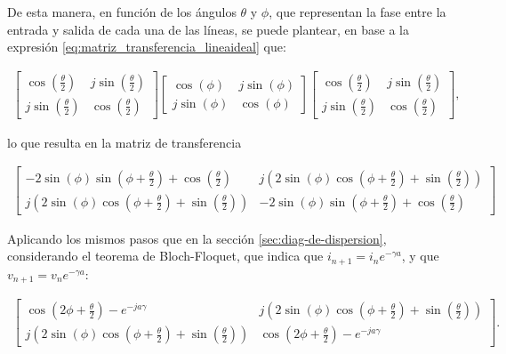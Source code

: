 De esta manera, en función de los ángulos $\theta$ y $\phi$, que representan la fase entre la entrada y salida de cada una de las líneas, se puede plantear, en base a la expresión \ref{eq:matriz_transferencia_lineaideal} que:

\begin{align}
	\left[
		\begin{matrix}
			\cos{\left (\frac{\theta}{2} \right )} & j \sin{\left (\frac{\theta}{2} \right )}\\
			j \sin{\left (\frac{\theta}{2} \right )} & \cos{\left (\frac{\theta}{2} \right )}
		\end{matrix}
	\right]
	\left[
		\begin{matrix}
			\cos{\left (\phi \right )} & j \sin{\left (\phi \right )}\\
			j\sin{\left (\phi \right )} & \cos{\left (\phi \right )}
		\end{matrix}
	\right]
	\left[
		\begin{matrix}
			\cos{\left (\frac{\theta}{2} \right )} & j \sin{\left (\frac{\theta}{2} \right )}\\
			j \sin{\left (\frac{\theta}{2} \right )} & \cos{\left (\frac{\theta}{2} \right )}
		\end{matrix}
	\right],
\end{align}

lo que resulta en la matriz de transferencia

\begin{align}
	\left[
		\begin{matrix}
			- 2 \sin{\left (\phi \right )} \sin{\left (\phi + \frac{\theta}{2} \right )} + \cos{\left (\frac{\theta}{2} \right )} & j \left(2 \sin{\left (\phi \right )} \cos{\left (\phi + \frac{\theta}{2} \right )} + \sin{\left (\frac{\theta}{2} \right )}\right)\\
			j \left(2 \sin{\left (\phi \right )} \cos{\left (\phi + \frac{\theta}{2} \right )} + \sin{\left (\frac{\theta}{2} \right )}\right) & - 2\sin{\left (\phi \right )} \sin{\left (\phi + \frac{\theta}{2} \right )} + \cos{\left (\frac{\theta}{2} \right )}
		\end{matrix}
	\right]
\end{align}

Aplicando los mismos pasos que en la sección \ref{sec:diag-de-dispersion}, considerando el teorema de Bloch-Floquet, que indica que $i_{n+1} = i_{n} e^{-\gamma a}$, y que $v_{n+1} = v_{n} e^{-\gamma a}$:

\begin{align}
	\left[
		\begin{matrix}
			\cos{\left (2 \phi + \frac{\theta}{2} \right )} - e^{-j a \gamma} & j \left(2 \sin{\left (\phi \right )} \cos{\left (\phi + \frac{\theta}{2} \right )} + \sin{\left (\frac{\theta}{2} \right )}\right)\\
			j \left(2 \sin{\left (\phi \right )} \cos{\left (\phi + \frac{\theta}{2} \right )} + \sin{\left (\frac{\theta}{2} \right )}\right) & \cos{\left (2 \phi + \frac{\theta}{2} \right )} - e^{- j a \gamma}
		\end{matrix}
	\right].
\end{align}

